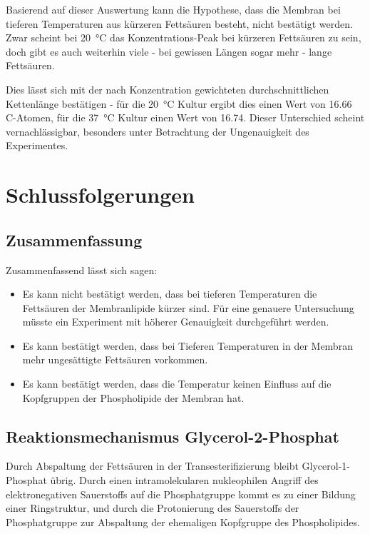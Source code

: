\documentclass[a4paper,english]{scrreprt}
\begin{document}
Basierend auf dieser Auswertung kann die Hypothese, dass die Membran bei
tieferen Temperaturen aus kürzeren Fettsäuren besteht, nicht bestätigt werden.
Zwar scheint bei \SI{20}{\celsius} das Konzentrations-Peak bei kürzeren
Fettsäuren zu sein, doch gibt es auch weiterhin viele - bei gewissen Längen
sogar mehr - lange Fettsäuren.

Dies lässt sich mit der nach Konzentration gewichteten durchschnittlichen
Kettenlänge bestätigen - für die \SI{20}{\celsius} Kultur ergibt dies einen
Wert von 16.66 C-Atomen, für die \SI{37}{\celsius} Kultur einen Wert von 16.74.
Dieser Unterschied scheint vernachlässigbar, besonders unter Betrachtung der
Ungenauigkeit des Experimentes.

\chapter{Schlussfolgerungen}

\section{Zusammenfassung}

Zusammenfassend lässt sich sagen:

\begin{itemize}
	\item Es kann nicht bestätigt werden, dass bei tieferen Temperaturen
		die Fettsäuren der Membranlipide kürzer sind. Für eine genauere
		Untersuchung müsste ein Experiment mit höherer Genauigkeit
		durchgeführt werden.
	\item Es kann bestätigt werden, dass bei Tieferen Temperaturen in der
		Membran mehr ungesättigte Fettsäuren vorkommen.
	\item Es kann bestätigt werden, dass die Temperatur keinen Einfluss
		auf die Kopfgruppen der Phospholipide der Membran hat.
\end{itemize}

\section{Reaktionsmechanismus Glycerol-2-Phosphat}

Durch Abspaltung der Fettsäuren in der Transesterifizierung bleibt
Glycerol-1-Phosphat übrig. Durch einen intramolekularen nukleophilen Angriff
des elektronegativen Sauerstoffs auf die Phosphatgruppe kommt es zu einer
Bildung einer Ringstruktur, und durch die Protonierung des Sauerstoffs der
Phosphatgruppe zur Abspaltung der ehemaligen Kopfgruppe des Phospholipides.
\end{document}
